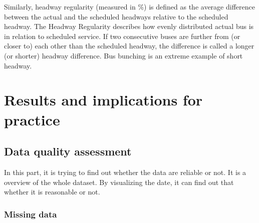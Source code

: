 \documentclass[12pt]{report}
\begin{document}
Similarly, headway regularity (measured in \%) is defined as the average difference between the actual and the scheduled headways relative to the scheduled headway. The Headway Regularity describes how evenly distributed actual bus is in relation to scheduled service.
If two consecutive buses are further from (or closer to) each other than the scheduled headway, the difference is called a longer (or shorter) headway difference. Bus bunching is an extreme example of short headway. 




\newpage

\section{Results and implications for practice}


\vspace{0.5cm}









 

\subsection{Data quality assessment}


 In this part, it is trying to find out whether the data are reliable or not. It is a overview of the whole dataset. By visualizing the date, it can find out that whether it is reasonable or not.
 
 \subsubsection*{Missing data}
 
\end{document}
